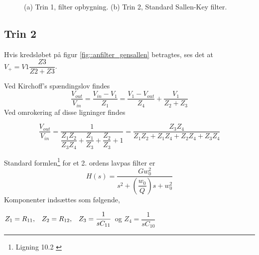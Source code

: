 \begin{figure}[h]
	\centering
	\caption{(a) Trin 1, filter opbygning. (b) Trin 2, Standard Sallen-Key filter.}
\end{figure}

\subsection{Trin 2}\label{sec::stage2}
Hvis kredsløbet på figur \ref{fig::anfilter_gensallen} betragtes, ses det at $V_+ = V1\dfrac{Z3}{Z2+Z3}$.

Ved Kirchoff's spændingslov findes\\
\begin{equation}
	\dfrac{V_{out}}{V_{in}} = \dfrac{V_{in}-V_1}{Z_1} = \dfrac{V_1 - V_{out}}{Z_4}+\dfrac{V_1}{Z_2+Z_3}
\end{equation}
Ved omrokering af disse ligninger findes

\begin{equation}\label{eq::anfilter_kcl}
	\dfrac{V_{out}}{V_{in}} = \dfrac{1}{\dfrac{Z_1Z_2}{Z_3Z_4}+\dfrac{Z_1}{Z_3}+\dfrac{Z_2}{Z_3}+1} = \dfrac{Z_3Z_4}{Z_1Z_2+Z_1Z_4+Z_2Z_4+Z_3Z_4}
\end{equation}

Standard formlen\footnote{Ligning 10.2 \cite[s. 218]{Su2002}}
 for et 2. ordens lavpas filter er
\begin{equation}\label{eq::anfilter_stndHS}
H(s) = \dfrac{Gw_0^2}{s^2 + \left(\dfrac{w_0}{Q}\right)s+w_0^2}
\end{equation}
Komponenter indsættes som følgende,
\begin{center}
	$Z_1 = R_{11}, \hspace{3mm} Z_2 = R_{12}, \hspace{3mm} Z_3 = \dfrac{1}{sC_{11}}$ \hspace{0.5mm} og \hspace{0.5mm} $Z_4 = \dfrac{1}{sC_{10}}$
\end{center}


